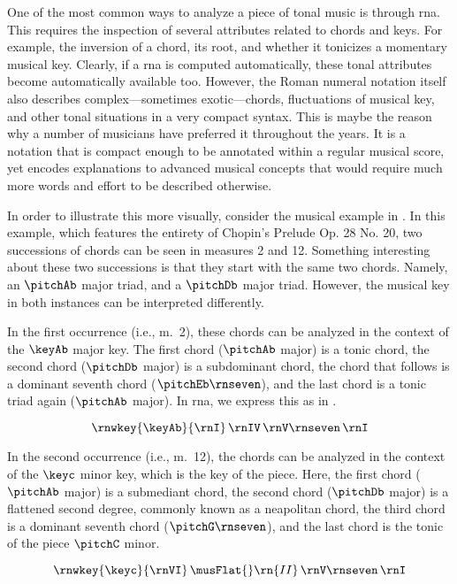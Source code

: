 
One of the most common ways to analyze a piece of tonal
music is through \gls{rna}. This requires the inspection of
several attributes related to chords and keys. For example,
the inversion of a chord, its root, and whether it tonicizes
a momentary musical key. Clearly, if a \gls{rna} is computed
automatically, these tonal attributes become automatically
available too. However, the Roman numeral notation itself
also describes complex---sometimes exotic---chords,
fluctuations of musical key, and other tonal situations in a
very compact syntax. This is maybe the reason why a number
of musicians have preferred it throughout the years. It is a
notation that is compact enough to be annotated within a
regular musical score, yet encodes explanations to advanced
musical concepts that would require much more words and
effort to be described otherwise.

In order to illustrate this more visually, consider the
musical example in . In this
example, which features the entirety of Chopin's Prelude Op.
28 No. 20, two successions of chords can be seen in measures
2 and 12. Something interesting about these two successions
is that they start with the same two chords. Namely, an
$\pitchAb$ major triad, and a $\pitchDb$ major triad.
However, the musical key in both instances can be
interpreted differently. 

In the first occurrence (i.e., m.~2), these chords can be
analyzed in the context of the $\keyAb$ major key. The first
chord ($\pitchAb$ major) is a tonic chord, the second chord
($\pitchDb$ major) is a subdominant chord, the chord that
follows is a dominant seventh chord ($\pitchEb\rnseven$),
and the last chord is a tonic triad again ($\pitchAb$
major). In \gls{rna}, we express this as in
.

\begin{equation}
    \label{eq:succession1}
    \rnwkey{\keyAb}{\rnI} \, \rnIV \, \rnV\rnseven \, \rnI
\end{equation}

In the second occurrence (i.e., m.~12), the chords can be
analyzed in the context of the $\keyc$ minor key, which is
the key of the piece. Here, the first chord ($\pitchAb$
major) is a submediant chord, the second chord ($\pitchDb$
major) is a flattened second degree, commonly known as a
\gls{neapolitan} chord, the third chord is a dominant
seventh chord ($\pitchG\rnseven$), and the last chord is the
tonic of the piece $\pitchC$ minor.

\begin{equation}
    \label{eq:succession2}
    \rnwkey{\keyc}{\rnVI} \, \musFlat{}\rn{II} \, \rnV\rnseven \, \rnI
\end{equation}


